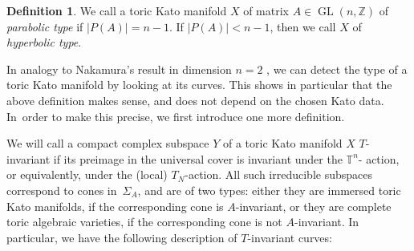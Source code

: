 \documentclass[JEP,XML,SOM,Unicode,NoFloatCountersInSection]{cedram}
\theoremstyle{definition}
\newtheorem{definition}[theorem]{Definition}
\newcommand{\TT}{\mathbb{T}}
\newcommand{\ZZ}{\mathbb{Z}}
\DeclareMathOperator{\GL}{GL}
\begin{document}
\begin{definition}
We call a toric Kato manifold $X$ of matrix $A\in\GL(n,\ZZ)$ of \textit{parabolic type} if $|P(A)|=n-1$. If $|P(A)|<n-1$, then we call $X$ of \textit{hyperbolic type}.
\end{definition}

In analogy to Nakamura's result in dimension $n=2$ \cite{naka84}, we can detect the type of a toric Kato manifold by looking at its curves. This shows in particular that the above definition makes sense, and does not depend on the chosen Kato data. In~order to make this precise, we first introduce one more definition.

We will call a compact complex subspace $Y$ of a toric Kato manifold $X$ $T$-invariant if its preimage in the universal cover is invariant under the $\TT^n$- action, or equivalently, under the (local) $T_N$-action. All such irreducible subspaces correspond to cones in~$\Sigma_A$, and are of two types: either they are immersed toric Kato manifolds, if the corresponding cone is $A$-invariant, or they are complete toric algebraic varieties, if the corresponding cone is not $A$-invariant. In particular, we have the following description of $T$-invariant curves:
\end{document}
